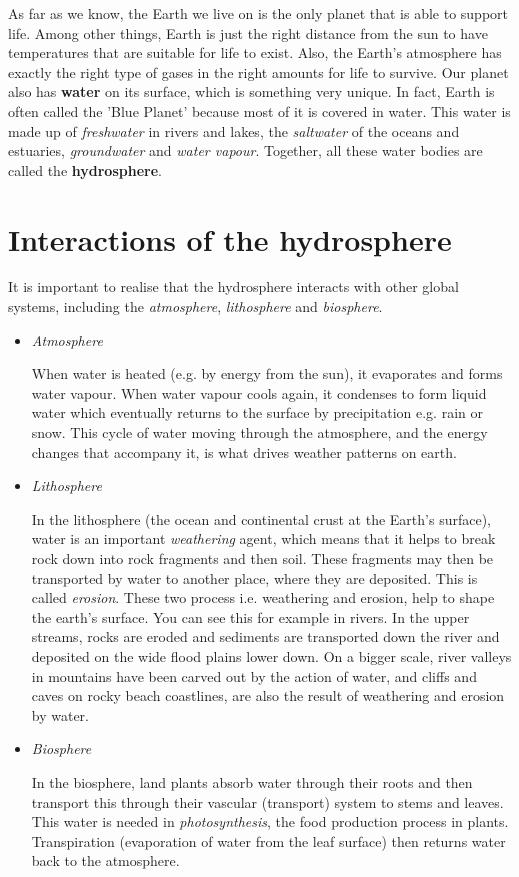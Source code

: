 As far as we know, the Earth we live on is the only planet that is able to support life. Among other things, Earth is just the right distance from the sun to have temperatures that are suitable for life to exist. Also, the Earth's atmosphere has exactly the right type of gases in the right amounts for life to survive. Our planet also has \textbf{water} on its surface, which is something very unique. In fact, Earth is often called the 'Blue Planet' because most of it is covered in water. This water is made up of \textit{freshwater} in rivers and lakes, the \textit{saltwater} of the oceans and estuaries, \textit{groundwater} and \textit{water vapour}. Together, all these water bodies are called the \textbf{hydrosphere}.






\section{Interactions of the hydrosphere}

It is important to realise that the hydrosphere interacts with other global systems, including the \textit{atmosphere}, \textit{lithosphere} and \textit{biosphere}.

\begin{itemize}
\item{\textit{Atmosphere}

When water is heated (e.g. by energy from the sun), it evaporates and forms water vapour. When water vapour cools again, it condenses to form liquid water which eventually returns to the surface by precipitation e.g. rain or snow. This cycle of water moving through the atmosphere, and the energy changes that accompany it, is what drives weather patterns on earth.
}
\item{\textit{Lithosphere}

In the lithosphere (the ocean and continental crust at the Earth's surface), water is an important \textit{weathering} agent, which means that it helps to break rock down into rock fragments and then soil. These fragments may then be transported by water to another place, where they are deposited. This is called \textit{erosion}. These two process i.e. weathering and erosion, help to shape the earth's surface. You can see this for example in rivers. In the upper streams, rocks are eroded and sediments are transported down the river and deposited on the wide flood plains lower down. On a bigger scale, river valleys in mountains have been carved out by the action of water, and cliffs and caves on rocky beach coastlines, are also the result of weathering and erosion by water.
}
\item{\textit{Biosphere}

In the biosphere, land plants absorb water through their roots and then transport this through their vascular (transport) system to stems and leaves. This water is needed in \textit{photosynthesis}, the food production process in plants. Transpiration (evaporation of water from the leaf surface) then returns water back to the atmosphere.
}
\end{itemize} 


